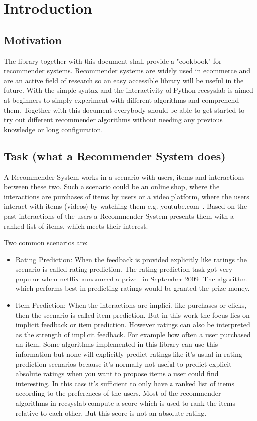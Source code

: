 \chapter{Introduction}


\section{Motivation}

The library together with this document shall provide a "cookbook"
for recommender systems. Recommender systems are widely used in ecommerce
and are an active field of research so an easy accessible library will be 
useful in the future.
With the simple syntax and the interactivity
of Python recsyslab is aimed at beginners to simply experiment with different
algorithms and comprehend them. Together with this document everybody
should be able to get started to try out different recommender algorithms
without needing any previous knowledge or long configuration.


\section{Task (what a Recommender System does)}

A Recommender System works in a scenario with users, items and interactions
between these two. Such a scenario could be an online shop,
where the interactions are purchases of items by users or a video
platform, where the users interact with items (videos) by watching
them e.g. youtube.com~\cite{youtube}. Based on the past interactions of the users
a Recommender System presents them with a ranked list of items, which meets their interest.

Two common scenarios are:
\begin{itemize}
    \item Rating Prediction:
When the feedback is provided explicitly like ratings the scenario is called rating prediction. 
The rating prediction task got very popular when netflix announced a prize~\cite{netflixprize}
in September 2009. The algorithm which performs best in predicting ratings 
would be granted the prize money.
    \item Item Prediction:
When the interactions are implicit like purchases or clicks, then the
scenario is called item prediction. But in this work the focus lies on implicit feedback or item prediction.
However ratings can also be interpreted as the strength of implicit feedback.
For example how often a user purchased an item. Some algorithms implemented
in this library can use this information but none will explicitly
predict ratings like it's usual in rating prediction scenarios because
it's normally not useful to predict explicit absolute ratings when
you want to propose items a user could find interesting. In this case
it's sufficient to only have a ranked list of items according to the 
preferences of the users. Most of the recommender algorithms in recsyslab
compute a score which is used to rank the items relative to each other.
But this score is not an absolute rating.
\end{itemize}


